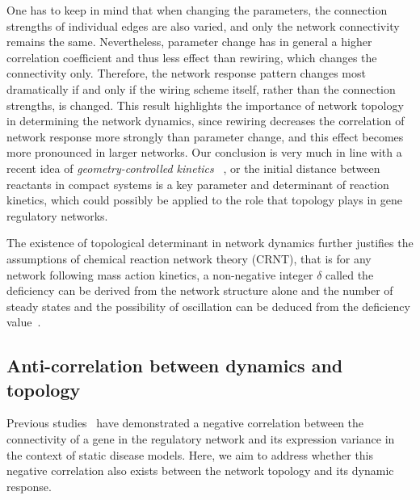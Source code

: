 One has to keep in mind that when changing the parameters,
the connection strengths of individual edges are also varied,
and only the network connectivity remains the same. Nevertheless,
parameter change has in general a higher correlation coefficient
and thus less effect than rewiring, which changes the connectivity only.
Therefore, the network response pattern changes most dramatically
if and only if the wiring scheme
itself, rather than the connection strengths, is changed.
This result highlights the importance of network topology in
determining the network dynamics, 
since rewiring decreases
the correlation of network response more strongly than 
parameter change, and this effect becomes more pronounced in
larger networks. Our conclusion is very much in line with a 
recent idea of \emph{geometry-controlled kinetics}~%
\citep{Benichou2010}, or the 
initial distance between reactants in compact systems is 
a key parameter and determinant of reaction kinetics, which 
could possibly be applied to the role that topology plays 
in gene regulatory networks.

The existence of topological determinant in network dynamics
further justifies the assumptions of chemical reaction network
theory (CRNT), that is for any network following mass action kinetics,
a non-negative integer $\delta$ called the
deficiency can be derived from the network structure
alone and the number of steady states and the possibility of 
oscillation can be deduced from the deficiency value~\citep{Conradi2005}.

\subsection{Anti-correlation between dynamics and topology}
\label{sec:anti-correlation}
Previous studies~\citep{Lu2007a,Mar2011} have demonstrated a negative
correlation between the connectivity of a gene in the regulatory network
and its expression variance in the context of static disease models.
Here, we aim to address whether this negative correlation also exists 
between the network topology and its dynamic response.


